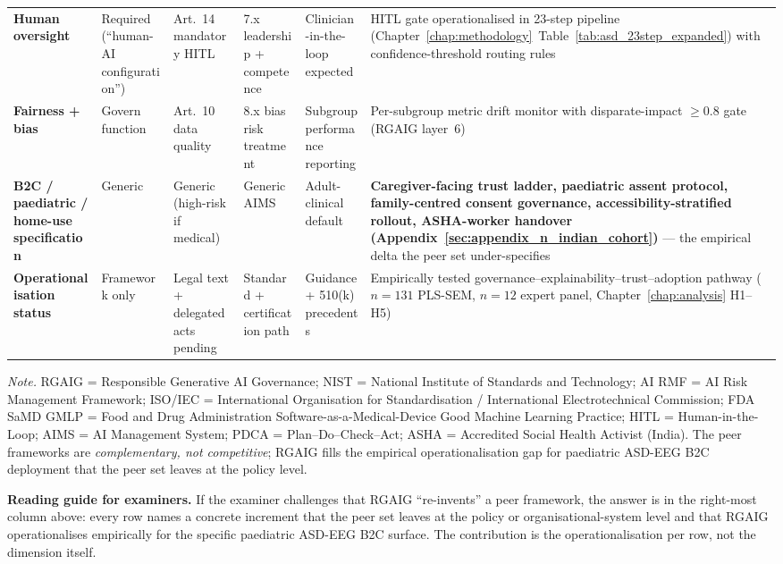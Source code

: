 {\begin{xltabular}{\textwidth}{@{} >{\raggedright\arraybackslash}p{2.0cm} p{2.0cm} p{2.1cm} p{2.0cm} p{2.1cm} >{\raggedright\arraybackslash}p{3.9cm} @{}}
\addlinespace
\textbf{Human oversight} & Required (``human-AI configuration'') & Art.~14 mandatory HITL & 7.x leadership + competence & Clinician-in-the-loop expected & HITL gate operationalised in 23-step pipeline (Chapter~\ref{chap:methodology}~Table~\ref{tab:asd_23step_expanded}) with confidence-threshold routing rules \\
\addlinespace
\textbf{Fairness + bias} & Govern function & Art.~10 data quality & 8.x bias risk treatment & Subgroup performance reporting & Per-subgroup metric drift monitor with disparate-impact $\geq 0.8$ gate (RGAIG layer~6) \\
\addlinespace
\textbf{B2C / paediatric / home-use specification} & Generic & Generic (high-risk if medical) & Generic AIMS & Adult-clinical default & \textbf{Caregiver-facing trust ladder, paediatric assent protocol, family-centred consent governance, accessibility-stratified rollout, ASHA-worker handover (Appendix~\ref{sec:appendix_n_indian_cohort})} --- the empirical delta the peer set under-specifies \\
\addlinespace
\textbf{Operationalisation status} & Framework only & Legal text + delegated acts pending & Standard + certification path & Guidance + 510(k) precedents & Empirically tested governance--explainability--trust--adoption pathway ($n=131$ PLS-SEM, $n=12$ expert panel, Chapter~\ref{chap:analysis} H1--H5) \\
\end{xltabular}}
\vspace{0.4em}\noindent\textit{Note.} RGAIG = Responsible Generative AI Governance; NIST = National Institute of Standards and Technology; AI RMF = AI Risk Management Framework; ISO/IEC = International Organisation for Standardisation / International Electrotechnical Commission; FDA SaMD GMLP = Food and Drug Administration Software-as-a-Medical-Device Good Machine Learning Practice; HITL = Human-in-the-Loop; AIMS = AI Management System; PDCA = Plan--Do--Check--Act; ASHA = Accredited Social Health Activist (India). The peer frameworks are \emph{complementary, not competitive}; RGAIG fills the empirical operationalisation gap for paediatric ASD-EEG B2C deployment that the peer set leaves at the policy level.

\bigskip

\noindent\textbf{Reading guide for examiners.} If the examiner challenges that RGAIG ``re-invents'' a peer framework, the answer is in the right-most column above: every row names a concrete increment that the peer set leaves at the policy or organisational-system level and that RGAIG operationalises empirically for the specific paediatric ASD-EEG B2C surface. The contribution is the operationalisation per row, not the dimension itself.

